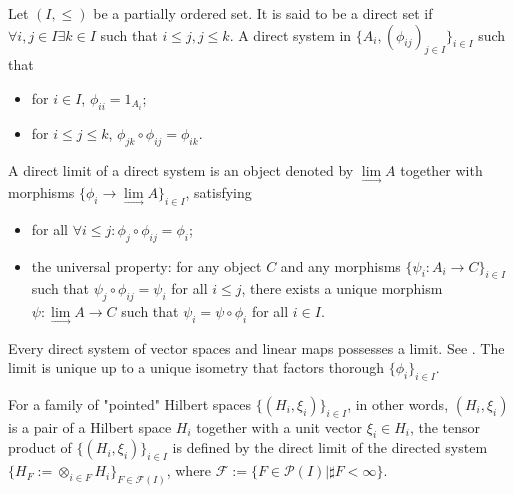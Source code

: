 \begin{definition}
    
\end{definition}

\begin{definition}
    Let $(I,\leq)$ be a partially ordered set. It is said to be a direct set if $\forall i,j\in I\exists k\in I$ such that $i\leq j, j\leq k$. A direct system in $\{A_i,(\phi_{i j})_{j\in I}\}_{i\in I}$ such that 
    \begin{itemize}
        \item for $i\in I$, $\phi_{ii}=1_{A_i}$;
        \item for $i\leq j\leq k$, $\phi_{j k}\circ\phi_{i j}=\phi_{i k}$.
    \end{itemize}
    A direct limit of a direct system is an object denoted by $\lim\limits_{\longrightarrow} A$ together with morphisms $\{\phi_i\to\lim\limits_{\longrightarrow} A\}_{i\in I}$, satisfying
    \begin{itemize}
        \item for all $\forall i\leq j\colon\phi_{j}\circ\phi_{i j}=\phi_i$;
        \item the universal property: for any object $C$ and any morphisms $\{\psi_i\colon A_i\to C\}_{i\in I}$ such that $\psi_j\circ\phi_{i j}=\psi_i$ for all $i\leq j$, there exists a unique morphism $\psi\colon \lim\limits_{\longrightarrow} A\to C$ such that $\psi_i=\psi\circ\phi_i$ for all $i\in I$.
    \end{itemize}
\end{definition}

\begin{remark}
    Every direct system of vector spaces and linear maps possesses a limit. 
    See \cite[\href{https://stacks.math.columbia.edu/tag/07N7}{Section 07N7}]{stacks-project}. The limit is unique up to a unique isometry that factors thorough $\{\phi_i\}_{i\in I}$.
\end{remark}

\begin{definition}
    For a family of "pointed" Hilbert spaces $\{(H_i,\xi_i)\}_{i\in I}$, in other words, $(H_i,\xi_i)$ is a pair of a Hilbert space $H_i$ together with a unit vector $\xi_i\in H_i$, the tensor product of $\{(H_i,\xi_i)\}_{i\in I}$ is defined by the direct limit of the directed system $\{H_F:=\otimes_{i\in F}H_i\}_{F\in\mathcal{F}(I)}$, where $\mathcal{F}:=\{F\in\mathcal{P}(I)|\sharp F<\infty\}$.
\end{definition}


